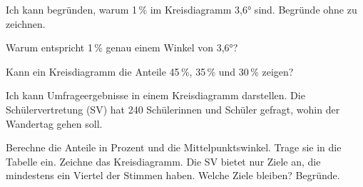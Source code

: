\begin{aufgabe}{Ich kann begründen, warum 1\,\% im Kreisdiagramm 3,6° sind.}
Begründe ohne zu zeichnen.
\begin{teile}
\teil Warum entspricht 1\,\% genau einem Winkel von 3,6°?
\par\vspace{12mm}
\teil Kann ein Kreisdiagramm die Anteile 45\,\%, 35\,\% und 30\,\% zeigen?
\par\vspace{12mm}
\end{teile}
\end{aufgabe}

\begin{aufgabe}{Ich kann Umfrageergebnisse in einem Kreisdiagramm darstellen.}
Die Schülervertretung (SV) hat 240 Schülerinnen und Schüler gefragt, wohin der Wandertag gehen soll.


\noindent\begin{minipage}[t]{0.55\linewidth}
\begin{teile}
\teil Berechne die Anteile in Prozent und die Mittelpunktswinkel. Trage sie in die Tabelle ein.
\teil Zeichne das Kreisdiagramm.
\teil Die SV bietet nur Ziele an, die mindestens ein Viertel der Stimmen haben. Welche Ziele bleiben? Begründe.
\end{teile}
\end{minipage}\hfill
\begin{minipage}[t]{0.42\linewidth}
\kreisleer[2.2]
\end{minipage}
\end{aufgabe}
